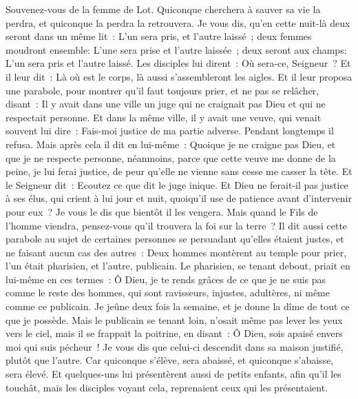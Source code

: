 \begin{multicols}{2}
Souvenez-vous de la femme de Lot.
Quiconque cherchera à sauver sa vie la perdra, et quiconque la perdra la retrouvera.
Je vous dis, qu'en cette nuit-là deux seront dans un même lit~: L'un sera pris, et l'autre laissé~;
deux femmes moudront ensemble: L'une sera prise et l'autre laissée~;
deux seront aux champs: L'un sera pris et l'autre laissé.
Les disciples lui dirent~: Où sera-ce, Seigneur~? Et il leur dit~: Là où est le corps, là aussi s'assembleront les aigles.
\VerseOne{}Et il leur proposa une parabole, pour montrer qu'il faut toujours prier, et ne pas se relâcher,
disant~: Il y avait dans une ville un juge qui ne craignait pas Dieu et qui ne respectait personne.
Et dans la même ville, il y avait une veuve, qui venait souvent lui dire~: Fais-moi justice de ma partie adverse.
Pendant longtemps il refusa. Mais après cela il dit en lui-même~: Quoique je ne craigne pas Dieu, et que je ne respecte personne,
néanmoins, parce que cette veuve me donne de la peine, je lui ferai justice, de peur qu'elle ne vienne sans cesse me casser la tête.
Et le Seigneur dit~: Ecoutez ce que dit le juge inique.
Et Dieu ne ferait-il pas justice à ses élus, qui crient à lui jour et nuit, quoiqu'il use de patience avant d'intervenir pour eux~?
Je vous le dis que bientôt il les vengera. Mais quand le Fils de l'homme viendra, pensez-vous qu'il trouvera la foi sur la terre~?
Il dit aussi cette parabole au sujet de certaines personnes se persuadant qu'elles étaient justes, et ne faisant aucun cas des autres~:
Deux hommes montèrent au temple pour prier, l'un était pharisien, et l'autre, publicain.
Le pharisien, se tenant debout, priait en lui-même en ces termes~: Ô Dieu, je te rends grâces de ce que je ne suis pas comme le reste des hommes, qui sont ravisseurs, injustes, adultères, ni même comme ce publicain.
Je jeûne deux fois la semaine, et je donne la dîme de tout ce que je possède.
Mais le publicain se tenant loin, n'osait même pas lever les yeux vers le ciel, mais il se frappait la poitrine, en disant~: Ô Dieu, sois apaisé envers moi qui suis pécheur~!
Je vous dis que celui-ci descendit dans sa maison justifié, plutôt que l'autre. Car quiconque s'élève, sera abaissé, et quiconque s'abaisse, sera élevé.
Et quelques-uns lui présentèrent aussi de petits enfants, afin qu'il les touchât, mais les disciples voyant cela, reprenaient ceux qui les présentaient.

\end{multicols}
